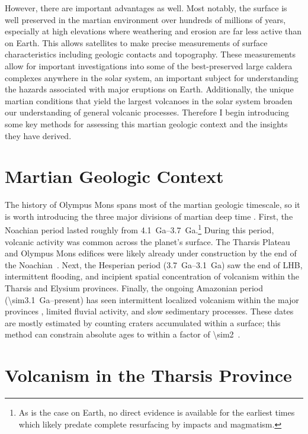 However, there are important advantages as well. Most notably, the surface is well preserved in the martian environment over hundreds of millions of years, especially at high elevations where weathering and erosion are far less active than on Earth. This allows satellites to make precise measurements of surface characteristics including geologic contacts and topography. These measurements allow for important investigations into some of the best-preserved large caldera complexes anywhere in the solar system, an important subject for understanding the hazards associated with major eruptions on Earth. Additionally, the unique martian conditions that yield the largest volcanoes in the solar system broaden our understanding of general volcanic processes. Therefore I begin introducing some key methods for assessing this martian geologic context and the insights they have derived.

\section{Martian Geologic Context}

The history of Olympus Mons spans most of the martian geologic timescale, so it is worth introducing the three major divisions of martian deep time \parencite{carr_geologic_2010}. First, the Noachian period lasted roughly from \qtyrange{4.1}{3.7}{Ga}.\footnote{As is the case on Earth, no direct evidence is available for the earliest times which likely predate complete resurfacing by impacts and magmatism.} During this period, volcanic activity was common across the planet's surface. The Tharsis Plateau and Olympus Mons edifices were likely already under construction by the end of the Noachian~\parencite[cf.][]{isherwood_volcanic_2013,broquet_gravitational_2019}. Next, the Hesperian period (\qtyrange{3.7}{3.1}{Ga}) saw the end of \acl{LHB}, intermittent flooding, and incipient spatial concentration of volcanism within the Tharsis and Elysium provinces. Finally, the ongoing Amazonian period (\qty{\sim3.1}{Ga}--present) has seen intermittent localized volcanism within the major provinces \parencite[e.g.,][]{grott_long-term_2013}, limited fluvial activity, and slow sedimentary processes. These dates are mostly estimated by counting craters accumulated within a surface; this method can constrain absolute ages to within a factor of \num{\sim2}~\parencite[e.g.,][]{kneissl_map-projection-independent_2011}.

\section{Volcanism in the Tharsis Province}

